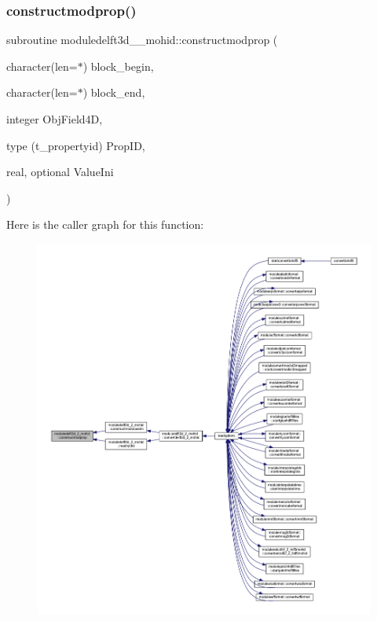 \mbox{\label{namespacemoduledelft3d__2__mohid_a39e0d7490596c9b34419ca060790d641}} 
\subsubsection{\texorpdfstring{constructmodprop()}{constructmodprop()}}
{\footnotesize\ttfamily subroutine moduledelft3d\+\_\+\_\+mohid\+::constructmodprop (\begin{DoxyParamCaption}\item[{character(len=$\ast$)}]{block\+\_\+begin,  }\item[{character(len=$\ast$)}]{block\+\_\+end,  }\item[{integer}]{Obj\+Field4D,  }\item[{type (t\+\_\+propertyid)}]{Prop\+ID,  }\item[{real, optional}]{Value\+Ini }\end{DoxyParamCaption})\hspace{0.3cm}{\ttfamily [private]}}

Here is the caller graph for this function\+:\nopagebreak
\begin{figure}[H]
\begin{center}
\leavevmode
\includegraphics[width=350pt]{namespacemoduledelft3d__2__mohid_a39e0d7490596c9b34419ca060790d641_icgraph}
\end{center}
\end{figure}
\mbox{\label{namespacemoduledelft3d__2__mohid_a6272b392fbc31727600ca81ee8fe5d43}} 
